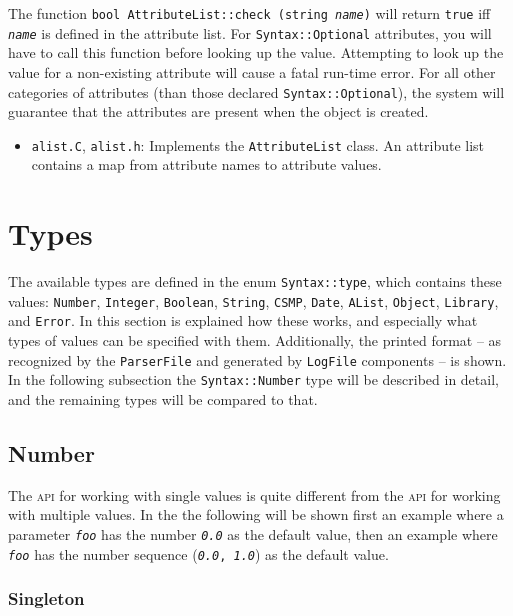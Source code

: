 \documentclass{article}
\newcommand{\code}[1]{\texttt{#1}}
\newcommand{\file}[1]{\texttt{#1}}
\begin{document}
The function \code{bool AttributeList::check (string \textit{name})}
will return \code{true} iff \texttt{\textit{name}} is defined in the
attribute list.  For \code{Syntax::Optional} attributes, you will have
to call this function before looking up the value.  Attempting to look
up the value for a non-existing attribute will cause a fatal run-time
error.  For all other categories of attributes (than those declared
\code{Syntax::Optional}), the system will guarantee that the
attributes are present when the object is created.

\begin{itemize}
\item \file{alist.C}, \file{alist.h}: Implements the
  \code{AttributeList} class.  An attribute list contains a map from
  attribute names to attribute values.
\end{itemize}

\section{Types}
\label{sec:types}

The available types are defined in the enum \code{Syntax::type}, which
contains these values: \code{Number}, \code{Integer}, \code{Boolean},
\code{String}, \code{CSMP}, \code{Date}, \code{AList}, \code{Object},
\code{Library}, and \code{Error}.  In this section is explained how
these works, and especially what types of values can be specified with
them.  Additionally, the printed format -- as recognized by the
\code{ParserFile} and generated by \code{LogFile} components -- is
shown.  In the following subsection the \code{Syntax::Number} type
will be described in detail, and the remaining types will be compared
to that.

\subsection{Number}

The \textsc{api} for working with single values is quite different
from the \textsc{api} for working with multiple values.  In the the
following will be shown first an example where a parameter
\texttt{\textit{foo}} has the number \texttt{\textit{0.0}} as the
default value, then an example where \texttt{\textit{foo}} has the
number sequence (\texttt{\textit{0.0}, \textit{1.0}}) as the default
value.

\subsubsection{Singleton}
\end{document}
